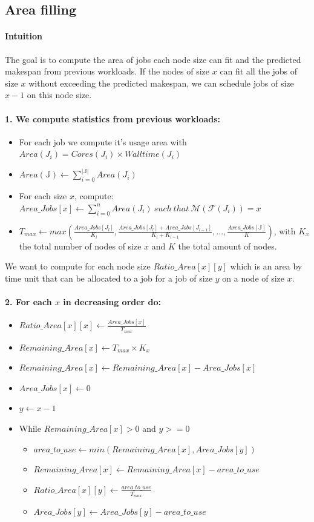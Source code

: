 \documentclass[a4paper]{article}
\newcommand{\inputs}{\ensuremath{\mathcal{F}}\xspace}
\newcommand{\memory}{\ensuremath{\mathcal{M}}\xspace}
\newcommand{\core}{\mathit{Cores}\xspace}
\newcommand{\walltime}{\mathit{Walltime}\xspace}
\newcommand{\jobset}{\ensuremath{\mathbb{J}}\xspace}
\begin{document}
\subsection{Area filling}
\paragraph{Intuition} The goal is to compute the area of jobs each node size can fit and the predicted makespan
from previous workloads. If the nodes of size $x$ can fit all the jobs of size $x$ without exceeding the predicted makespan,
we can schedule jobs of size $x - 1$ on this node size.

\paragraph{1. We compute statistics from previous workloads:}
\begin{itemize}
	\item For each job we compute it's usage area with $Area(J_i) = \core(J_i) \times \walltime(J_i)$
	\item $Area(\jobset) \gets \sum_{i=0}^{|\jobset|} Area(J_i)$
	\item For each size $x$, compute: $Area\_Jobs[x] \gets \sum_{i=0}^{n} Area(J_i)~such~that~\memory(\inputs(J_i)) = x$
	\item $T_{max} \gets max(\frac{Area\_Jobs[J_l]}{K_l}, \frac{Area\_Jobs[J_l] + Area\_Jobs[J_{l - 1}]}{K_l + K_{l - 1}}, ..., \frac{Area\_Jobs[\jobset]}{K})$, with $K_x$ the total number of nodes of size $x$ and $K$ the total amount of nodes.
\end{itemize}

We want to compute for each node size $Ratio\_Area[x][y]$ which is an area by time unit that can be allocated to a job for a job of
size $y$ on a node of size $x$.

\paragraph{2. For each $x$ in decreasing order do:}
\begin{itemize}
	\item $Ratio\_Area[x][x] \gets \frac{Area\_Jobs[x]}{T_{max}}$
	\item $Remaining\_Area[x] \gets T_{max} \times K_x$
	\item $Remaining\_Area[x] \gets Remaining\_Area[x] - Area\_Jobs[x]$
	\item $Area\_Jobs[x] \gets 0$
	\item $y \gets x - 1$
	\item While $Remaining\_Area[x]>0$ and $y>=0$
	\begin{itemize}
		\item $area\_to\_use \gets min(Remaining\_Area[x], Area\_Jobs[y])$
		\item $Remaining\_Area[x] \gets Remaining\_Area[x] - area\_to\_use$
		\item $Ratio\_Area[x][y] \gets \frac{area\_to\_use}{T_{max}}$
		\item $Area\_Jobs[y] \gets Area\_Jobs[y] - area\_to\_use$
	\end{itemize}
\end{itemize}
\end{document}
